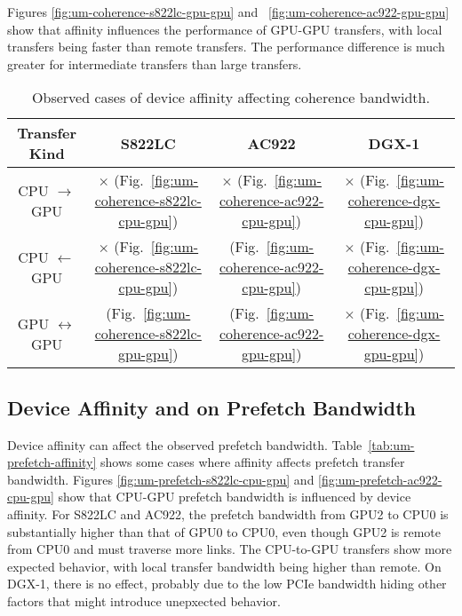 Figures \ref{fig:um-coherence-s822lc-gpu-gpu} and ~\ref{fig:um-coherence-ac922-gpu-gpu} show that affinity influences the performance of GPU-GPU transfers, with local transfers being faster than remote transfers.
The performance difference is much greater for intermediate transfers than large transfers.

\begin{table}[ht]
	\centering
	\caption[Device Affinity and Coherence Bandwidth]{
		Observed cases of device affinity affecting coherence bandwidth.
	}
	\label{tab:um-coherence-affinity}
	\begin{tabular}{cccc}
		\hline
		\textbf{Transfer Kind}    & \textbf{S822LC}                                         & \textbf{AC922}                                         & \textbf{DGX-1}                            \\ \hline 
		CPU $\rightarrow$     GPU & $\times$   (Fig.~\ref{fig:um-coherence-s822lc-cpu-gpu}) & $\times$   (Fig.~\ref{fig:um-coherence-ac922-cpu-gpu}) & $\times$ (Fig.~\ref{fig:um-coherence-dgx-cpu-gpu}) \\ \hline
		CPU $\leftarrow$      GPU & $\times$   (Fig.~\ref{fig:um-coherence-s822lc-cpu-gpu}) & \checkmark (Fig.~\ref{fig:um-coherence-ac922-cpu-gpu}) & $\times$ (Fig.~\ref{fig:um-coherence-dgx-cpu-gpu}) \\ \hline
		GPU $\leftrightarrow$ GPU & \checkmark (Fig.~\ref{fig:um-coherence-s822lc-gpu-gpu}) & \checkmark (Fig.~\ref{fig:um-coherence-ac922-gpu-gpu}) & $\times$ (Fig.~\ref{fig:um-coherence-dgx-gpu-gpu}) \\ \hline
	\end{tabular}
\end{table}


\subsection{Device Affinity and on Prefetch Bandwidth}

Device affinity can affect the observed prefetch bandwidth.
Table~\ref{tab:um-prefetch-affinity} shows some cases where affinity affects prefetch transfer bandwidth.
Figures \ref{fig:um-prefetch-s822lc-cpu-gpu} and \ref{fig:um-prefetch-ac922-cpu-gpu} show that CPU-GPU prefetch bandwidth is influenced by device affinity.
For S822LC and AC922, the prefetch bandwidth from GPU2 to CPU0 is substantially higher than that of GPU0 to CPU0, even though GPU2 is remote from CPU0 and must traverse more links.
The CPU-to-GPU transfers show more expected behavior, with local transfer bandwidth being higher than remote.
On DGX-1, there is no effect, probably due to the low PCIe bandwidth hiding other factors that might introduce unepxected behavior.

